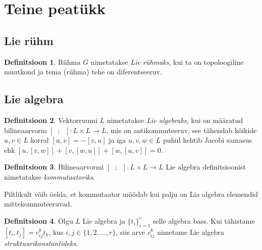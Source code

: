 \documentclass[a4paper,12pt]{article}
\theoremstyle{plain}
\theoremstyle{definition}
\newtheorem{definitsioon}{Definitsioon}[section]
\numberwithin{equation}{section}
\begin{document}
\newpage
%
%
\section{Teine peatükk}
\subsection{Lie rühm}

\begin{definitsioon}
Rühma $G$ nimetatakse \emph{Lie rühmaks}, kui ta on topoloogiline muutkond ja tema (rühma) tehe on diferentseeruv.
\end{definitsioon}


\subsection{Lie algebra}

\begin{definitsioon} \label{def:lie-algebra}
Vektorruumi $L$ nimetatakse \emph{Lie algebraks}, kui on määratud bilineaarvorm $\left[\phantom{u};\phantom{u}\right] : L \times L \rightarrow L$, mis on antikommuteeruv, see tähendab kõikide $u, v \in L$ korral $\left[u, v\right] = - \left[v, u\right]$ ja iga $u, v, w \in L$ puhul kehtib Jacobi samasus ehk $\left[u, \left[v, w\right]\right] + \left[v, \left[w, u\right]\right] + \left[w, \left[u, v\right]\right] = 0$.
\end{definitsioon}

\begin{definitsioon}
Bilineaarvormi $\left[\phantom{u};\phantom{u}\right] : L \times L \rightarrow L$ Lie algebra definitsioonist nimetatakse \emph{kommutaatoriks}.
\end{definitsioon}

Piltlikult võib öelda, et kommutaator mõõdab kui palju on Lia algebra elemendid mittekommuteeruvad.

\begin{definitsioon}
Olgu $L$ Lie algebra ja $\{t_i\}_{i = 1}^{r}$ selle algebra bass. Kui tähistame $\left[t_i, t_j\right] = c_{ij}^{k} t_{k}$, kus $i,j \in \{1, 2, \ldots, r\}$, siis arve $c_{ij}^{k}$ nimetame Lie algebra \emph{struktuurikonstantideks}.
\end{definitsioon}
\end{document}
